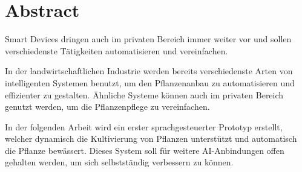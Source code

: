 \section*{Abstract}
%

Smart Devices dringen auch im privaten Bereich immer weiter vor und sollen verschiedenste Tätigkeiten automatisieren und vereinfachen. 

In der landwirtschaftlichen Industrie werden bereits verschiedenste Arten von intelligenten Systemen benutzt, um den Pflanzenanbau zu automatisieren und effizienter zu gestalten. Ähnliche Systeme können auch im privaten Bereich genutzt werden, um die Pflanzenpflege zu vereinfachen.

In der folgenden Arbeit wird ein erster sprachgesteuerter Prototyp erstellt, welcher dynamisch die Kultivierung von Pflanzen unterstützt und automatisch die Pflanze bewässert. Dieses System soll für weitere AI-Anbindungen offen gehalten werden, um sich selbstständig verbessern zu können.